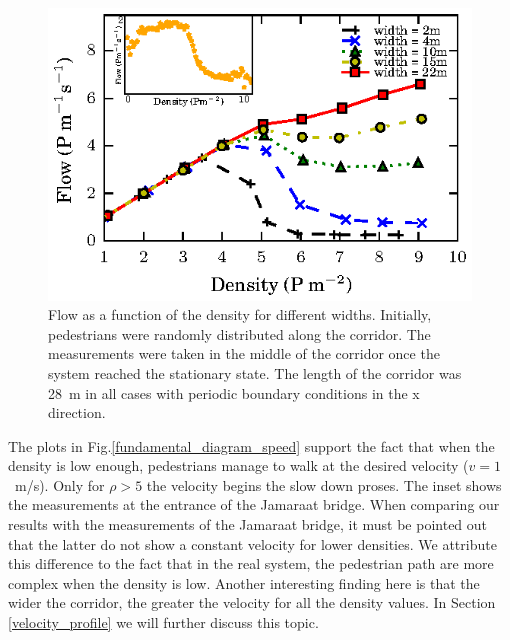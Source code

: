 \begin{figure}[htbp!]
\includegraphics[width=\columnwidth]
{plots/flow-density_vd1_multiple_widths.eps}
\caption{\label{fundamental_diagram_flow} Flow as a function of the density for different widths. Initially, 
pedestrians were randomly distributed along the corridor. The measurements were taken in the middle
of the corridor once the system reached the stationary state. The length of the corridor 
was 28~m in all cases with periodic boundary conditions in the x direction.}
\end{figure}

The plots in Fig.\ref{fundamental_diagram_speed} support the fact that when the density is low enough, pedestrians manage to walk at the desired velocity ($v=1$~m/s). Only for $\rho>5$ the velocity begins the slow down proses. The inset shows the measurements at the entrance of the Jamaraat bridge. When comparing our results with the measurements of the Jamaraat bridge, it must be pointed out that the latter do not show a constant velocity for lower densities. We attribute this difference to the fact that in the real system, the pedestrian path are more complex when the density is low. Another interesting finding here is that the wider the corridor, the greater the velocity for all the density values. In Section \ref{velocity_profile} we will further discuss this topic.\\

